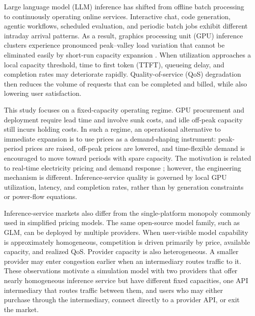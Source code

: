 \documentclass[11pt,a4paper]{article}
\begin{document}
Large language model (LLM) inference has shifted from offline batch processing to continuously operating online services. Interactive chat, code generation, agentic workflows, scheduled evaluation, and periodic batch jobs exhibit different intraday arrival patterns. As a result, graphics processing unit (GPU) inference clusters experience pronounced peak--valley load variation that cannot be eliminated easily by short-run capacity expansion \cite{crankshaw2017clipper,gujarati2020clockwork,yu2022orca,kwon2023pagedattention,agrawal2024sarathiserve}. When utilization approaches a local capacity threshold, time to first token (TTFT), queueing delay, and completion rates may deteriorate rapidly. Quality-of-service (QoS) degradation then reduces the volume of requests that can be completed and billed, while also lowering user satisfaction.

This study focuses on a fixed-capacity operating regime. GPU procurement and deployment require lead time and involve sunk costs, and idle off-peak capacity still incurs holding costs. In such a regime, an operational alternative to immediate expansion is to use prices as a demand-shaping instrument: peak-period prices are raised, off-peak prices are lowered, and time-flexible demand is encouraged to move toward periods with spare capacity. The motivation is related to real-time electricity pricing and demand response \cite{schweppe1988spot,borenstein2005long,albadi2008summary,faruqui2010household,siano2014demand}; however, the engineering mechanism is different. Inference-service quality is governed by local GPU utilization, latency, and completion rates, rather than by generation constraints or power-flow equations.

Inference-service markets also differ from the single-platform monopoly commonly used in simplified pricing models. The same open-source model family, such as GLM, can be deployed by multiple providers. When user-visible model capability is approximately homogeneous, competition is driven primarily by price, available capacity, and realized QoS. Provider capacity is also heterogeneous. A smaller provider may enter congestion earlier when an intermediary routes traffic to it. These observations motivate a simulation model with two providers that offer nearly homogeneous inference service but have different fixed capacities, one API intermediary that routes traffic between them, and users who may either purchase through the intermediary, connect directly to a provider API, or exit the market.
\end{document}
